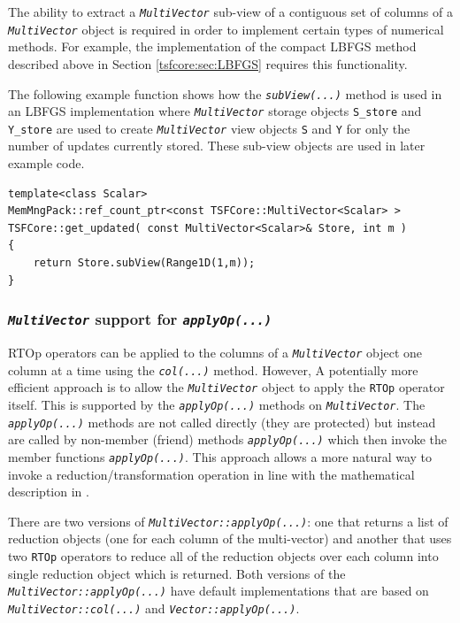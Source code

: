 \documentclass[10pt,fleqn]{article}
\begin{document}
The ability to extract a \texttt{\textit{MultiVector}} sub-view of a
contiguous set of columns of a \texttt{\textit{MultiVector}} object is
required in order to implement certain types of numerical methods.
For example, the implementation of the compact LBFGS method described
above in Section \ref{tsfcore:sec:LBFGS} requires this functionality.

The following example function shows how the
\texttt{\textit{subView(...)}} method is used in an LBFGS
implementation where \texttt{\textit{MultiVector}} storage objects
\texttt{S\_store} and \texttt{Y\_store} are used to create \texttt{\textit{MultiVector}}
view objects \texttt{S} and \texttt{Y} for only the number of updates
currently stored.  These sub-view objects are used in later example
code.

{\scriptsize\begin{verbatim}
template<class Scalar>
MemMngPack::ref_count_ptr<const TSFCore::MultiVector<Scalar> > TSFCore::get_updated( const MultiVector<Scalar>& Store, int m )
{
    return Store.subView(Range1D(1,m));
}
\end{verbatim}}

%
\subsubsection{\texttt{\textit{MultiVector}} support for \texttt{\textit{applyOp(...)}}}
\label{tsfcore:sec:multi_vec_apply_op}
%

RTOp operators can be applied to the columns of a 
\texttt{\textit{MultiVector}} object one column at a time
using the \texttt{\textit{col(...)}} method.  However, A potentially
more efficient approach is to allow the
\texttt{\textit{MultiVector}} object to apply the \texttt{RTOp} operator itself.
This is supported by the \texttt{\textit{applyOp(...)}} methods on
\texttt{\textit{MultiVector}}.  The \texttt{\textit{applyOp(...)}} methods are not
called directly (they are protected) but instead are called by
non-member (friend) methods \texttt{\textit{applyOp(...)}} which then
invoke the member functions \texttt{\textit{applyOp(...)}}.  This
approach allows a more natural way to invoke a
reduction/transformation operation in line with the mathematical
description in \cite{ref:rtop_toms}.

There are two versions of
\texttt{\textit{MultiVector\-::applyOp(...)}}: one that returns a list
of reduction objects (one for each column of the multi-vector) and
another that uses two \texttt{RTOp} operators to reduce all of the
reduction objects over each column into single reduction object which
is returned.  Both versions of the
\texttt{\textit{MultiVector\-::applyOp(...)}} have default implementations
that are based on \texttt{\textit{MultiVector\-::col(...)}} and
\texttt{\textit{Vector\-::applyOp(...)}}.
\end{document}
